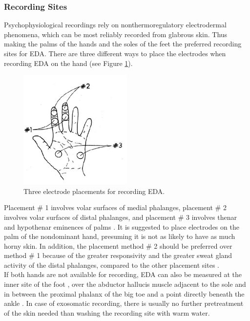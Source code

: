 \subsubsection{Recording Sites}
Psychophysiological recordings rely on nonthermoregulatory electrodermal phenomena, which can be most reliably recorded from glabrous skin. Thus making the palms of the hands and the soles of the feet the preferred recording sites for EDA. There are three different ways to place the electrodes when recording EDA on the hand (see Figure \ref{PalmImg}).

\begin{figure}[ht]
\centering
\includegraphics[width=0.5\textwidth]{images/electrodePlacement.png}
\caption{Three electrode placements for recording EDA.}
\label{PalmImg}
\end{figure}

Placement \# 1 involves volar surfaces of medial phalanges, placement \# 2 involves volar surfaces of distal phalanges, and placement \# 3 involves thenar and hypothenar eminences of palms \citep{HANDBOOKPP}.
It is suggested to place electrodes on the palm of the nondominant hand, presuming it is not as likely to have as much horny skin. In addition, the placement method \# 2 should be preferred over method \# 1 because of the greater responsivity and the greater sweat gland activity of the distal phalanges, compared to the other placement sites \citep{boucsein2012electrodermal}.\\
If both hands are not available for recording, EDA can also be measured at the inner site of the foot , over the abductor hallucis muscle adjacent to the sole and in between the proximal phalanx of the big toe and a point directly beneath the ankle \citep{boucsein2012electrodermal}. In case of exosomatic recording, there is usually no further pretreatment of the skin needed than washing the recording site with warm water.

